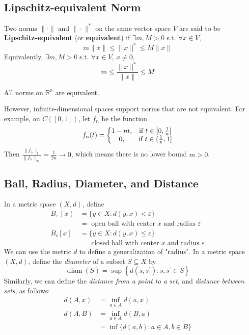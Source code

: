 \documentclass[11pt]{elegantbook}
\begin{document}
\subsection{Lipschitz-equivalent Norm}
\begin{definition}
\normalfont
Two norms $\|\cdot\|$ and $\|\cdot\|^*$ on the same vector space $V$ are said to be \textbf{Lipschitz-equivalent} (or \textbf{equivalent}) if $\exists m,M>0$ s.t. $\forall x\in V$, $$m\|x\|\leq\|x\|^*\leq M\|x\|$$
Equivalently, $\exists m,M>0$ s.t. $\forall x\in V$, $x\neq 0$, $$m\leq\frac{\|x\|^*}{\|x\|}\leq M$$
\end{definition}
\begin{theorem}
    All norms on $\mathbb{R}^n$ are equivalent.
\end{theorem}
However, infinite-dimensional spaces support norms that are not equivalent. For example, on $C([0, 1])$, let $f_n$ be the function $$f_n(t)=\left\{\begin{matrix}
    1-nt,&\textnormal{if }t\in[0,\frac{1}{n}]\\
    0,&\textnormal{if }t\in(\frac{1}{n},1]
\end{matrix}\right.$$ Then $\frac{\|f_n\|_1}{\|f_n\|_\infty}=\frac{1}{2n}\rightarrow 0$, which means there is no lower bound $m>0$.

\subsection{Ball, Radius, Diameter, and Distance}
In a metric space $(X, d)$, define
$$
\begin{aligned}
B_{\varepsilon}(x) & =\{y \in X: d(y, x)<\varepsilon\} \\
& =\text { open ball with center } x \text { and radius } \varepsilon \\
B_{\varepsilon}[x] & =\{y \in X: d(y, x) \leq \varepsilon\} \\
& =\text { closed ball with center } x \text { and radius } \varepsilon
\end{aligned}
$$
We can use the metric $d$ to define a generalization of "radius". In a metric space $(X, d)$, define the \textit{diameter} of a subset $S \subseteq X$ by
$$
\operatorname{diam}(S)=\sup \left\{d\left(s, s^{\prime}\right): s, s^{\prime} \in S\right\}
$$
Similarly, we can define the \textit{distance from a point to a set}, and \textit{distance between sets}, as follows:
$$
\begin{aligned}
d(A, x) & =\inf _{a \in A} d(a, x) \\
d(A, B) & =\inf _{a \in A} d(B, a) \\
& =\inf \{d(a, b): a \in A, b \in B\}
\end{aligned}
$$
\end{document}
